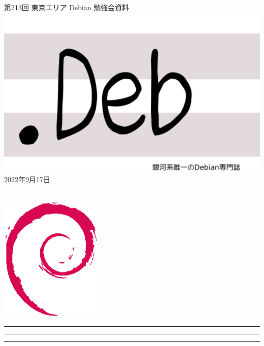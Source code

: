 \documentclass[mingoth,a4paper]{jsarticle}
\newcommand{\debmtgyear}{2022}
\newcommand{\debmtgmonth}{9}
\newcommand{\debmtgdate}{17}
\newcommand{\debmtgnumber}{213}
\begin{document}
\begin{titlepage}
\thispagestyle{empty}

\vspace*{-2cm}
第\debmtgnumber{}回 東京エリア Debian 勉強会資料\\
\hspace*{-2cm}
\includegraphics{image-assets/dotdeb.pdf}\\
\hfill{}\debmtgyear{}年\debmtgmonth{}月\debmtgdate{}日

\\

\vspace*{-2cm}
\hfill{}\includegraphics[height=6cm]{image-assets/openlogo-nd.eps}
\end{titlepage}

\newpage

\begin{minipage}[b]{0.2\hsize}
 \colorbox{titleback}{}
\end{minipage}
\begin{minipage}[b]{0.8\hsize}
\hrule
\vspace{2mm}
\hrule
\begin{multicols}{2}
\tableofcontents
\end{multicols}
\vspace{2mm}
\hrule
\end{minipage}
\end{document}
